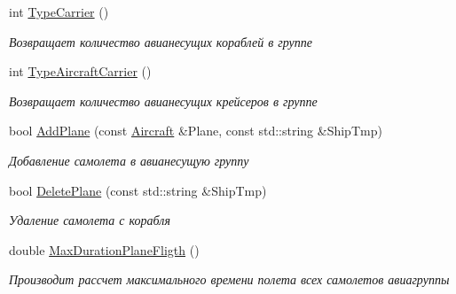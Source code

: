 \begin{DoxyCompactItemize}
\mbox{\label{class_aircraft_carrier_group_1_1_fleet_a0c5184e9f603c11e58c68ab34f0d0a30}} 
int \mbox{\hyperlink{class_aircraft_carrier_group_1_1_fleet_a0c5184e9f603c11e58c68ab34f0d0a30}{Type\+Carrier}} ()
\begin{DoxyCompactList}\small\item\em Возвращает количество авианесущих кораблей в группе \end{DoxyCompactList}\item 
\mbox{\label{class_aircraft_carrier_group_1_1_fleet_a2ebc181699850e8bff283a281c22ea2b}} 
int \mbox{\hyperlink{class_aircraft_carrier_group_1_1_fleet_a2ebc181699850e8bff283a281c22ea2b}{Type\+Aircraft\+Carrier}} ()
\begin{DoxyCompactList}\small\item\em Возвращает количество авианесущих крейсеров в группе \end{DoxyCompactList}\item 
bool \mbox{\hyperlink{class_aircraft_carrier_group_1_1_fleet_af7863ad9b057b0212b04019956254e8a}{Add\+Plane}} (const \mbox{\hyperlink{class_aircraft_carrier_group_1_1_aircraft}{Aircraft}} \&Plane, const std\+::string \&Ship\+Tmp)
\begin{DoxyCompactList}\small\item\em Добавление самолета в авианесущую группу \end{DoxyCompactList}\item 
bool \mbox{\hyperlink{class_aircraft_carrier_group_1_1_fleet_aa464eecb22e71128b6a01733d71fc27e}{Delete\+Plane}} (const std\+::string \&Ship\+Tmp)
\begin{DoxyCompactList}\small\item\em Удаление самолета с корабля \end{DoxyCompactList}\item 
\mbox{\label{class_aircraft_carrier_group_1_1_fleet_a3f8d69e2180159e964feb3ec41d442ee}} 
double \mbox{\hyperlink{class_aircraft_carrier_group_1_1_fleet_a3f8d69e2180159e964feb3ec41d442ee}{Max\+Duration\+Plane\+Fligth}} ()
\begin{DoxyCompactList}\small\item\em Производит рассчет максимального времени полета всех самолетов авиагруппы \end{DoxyCompactList}\item 

\end{DoxyCompactItemize}
